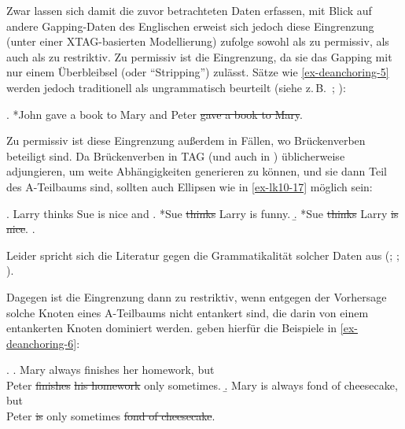 Zwar lassen sich damit die zuvor betrachteten Daten erfassen, mit Blick auf andere Gapping-Daten des Englischen erweist sich jedoch diese Eingrenzung (unter einer XTAG-basierten Modellierung) \cite{Lichte:Kallmeyer:10} zufolge sowohl als zu permissiv, als auch als zu restriktiv. Zu permissiv ist die Eingrenzung, da sie das Gapping mit nur einem Überbleibsel (oder "`Stripping"') zulässt. Sätze wie \ref{ex-deanchoring-5} werden jedoch traditionell als ungrammatisch beurteilt (siehe z.\,B.\ \citealt[27a]{Jackendoff:71}; \citealt[3]{Johnson:04}):

\ex.  *John gave a book to Mary and Peter \sout{gave a book to Mary}. \hfill
\citep[(13)]{Lichte:Kallmeyer:10}\label{ex-deanchoring-5}

Zu permissiv ist diese Eingrenzung  au\ss erdem in Fällen, wo Brückenverben beteiligt sind. Da  Brückenverben in TAG (und auch in ) üblicherweise adjungieren, um weite Abhängigkeiten generieren zu können, und sie dann Teil des A-Teilbaums sind, sollten auch Ellipsen wie in \ref{ex-lk10-17} möglich sein:    

\ex. Larry thinks Sue is nice and \label{ex-lk10-17}
\a. *Sue \sout{thinks} Larry is funny.
\b. *Sue \sout{thinks} Larry \sout{is nice}.
\z. \citep[(17)]{Lichte:Kallmeyer:10}

Leider spricht sich die Literatur gegen die Grammatikalität solcher Daten aus (\citealt[198]{Sag:76}; \citealt[18]{Johnson:04}; \citealt[1149]{Osborne:08}). 

Dagegen ist die Eingrenzung dann zu restriktiv, wenn entgegen der Vorhersage solche Knoten eines A-Teilbaums nicht entankert sind, die darin von einem entankerten Knoten dominiert werden. \cite{Lichte:Kallmeyer:10} geben hierfür die Beispiele in \ref{ex-deanchoring-6}:   

\ex. \label{ex-deanchoring-6}
\a. Mary always finishes her homework, but \\
Peter \sout{finishes}  \sout{his homework} only sometimes. \label{ex-deanchoring-6-a}
\b. Mary is always fond of cheesecake, but \\
Peter \sout{is} only sometimes \sout{fond of cheesecake}. \label{ex-deanchoring-6-b}

